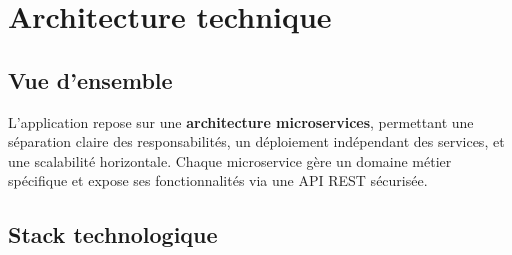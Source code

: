 \documentclass[12pt,a4paper]{article}
\newcommand{\highlight}[1]{\textbf{\color{primary}#1}}
\begin{document}
\newpage

\section{Architecture technique}

\subsection{Vue d'ensemble}

L'application repose sur une \highlight{architecture microservices}, permettant une séparation claire des responsabilités, un déploiement indépendant des services, et une scalabilité horizontale. Chaque microservice gère un domaine métier spécifique et expose ses fonctionnalités via une API REST sécurisée.

\subsection{Stack technologique}
\end{document}

